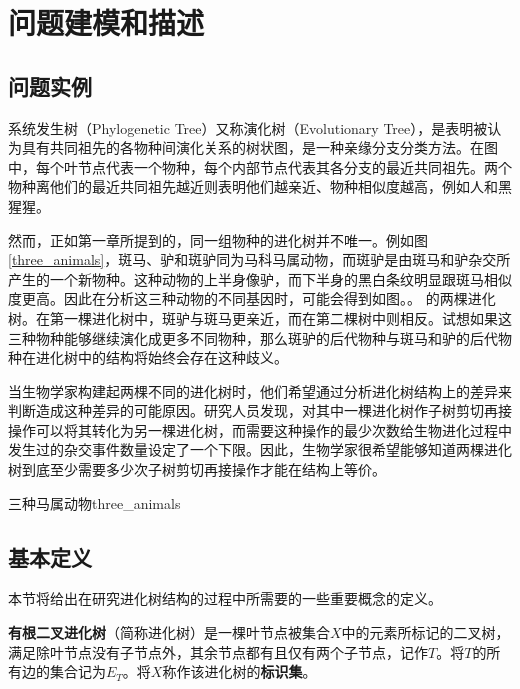 
\chapter{问题建模和描述}

\section{问题实例}

系统发生树（Phylogenetic Tree）又称演化树（Evolutionary Tree），是表明被认为具有共同祖先的各物种间演化关系的树状图，是一种亲缘分支分类方法。在图中，每个叶节点代表一个物种，每个内部节点代表其各分支的最近共同祖先。两个物种离他们的最近共同祖先越近则表明他们越亲近、物种相似度越高，例如人和黑猩猩。
$ $\\

然而，正如第一章所提到的，同一组物种的进化树并不唯一。例如图\ref{three_animals}，斑马、驴和斑驴同为马科马属动物，而斑驴是由斑马和驴杂交所产生的一个新物种。这种动物的上半身像驴，而下半身的黑白条纹明显跟斑马相似度更高。因此在分析这三种动物的不同基因时，可能会得到如图。。 的两棵进化树。在第一棵进化树中，斑驴与斑马更亲近，而在第二棵树中则相反。试想如果这三种物种能够继续演化成更多不同物种，那么斑驴的后代物种与斑马和驴的后代物种在进化树中的结构将始终会存在这种歧义。

当生物学家构建起两棵不同的进化树时，他们希望通过分析进化树结构上的差异来判断造成这种差异的可能原因。研究人员发现，对其中一棵进化树作子树剪切再接操作可以将其转化为另一棵进化树，而需要这种操作的最少次数给生物进化过程中发生过的杂交事件数量设定了一个下限。因此，生物学家很希望能够知道两棵进化树到底至少需要多少次子树剪切再接操作才能在结构上等价。

\begin{pics}[htbp]{三种马属动物}{three_animals} 
\end{pics}


\section{基本定义}
本节将给出在研究进化树结构的过程中所需要的一些重要概念的定义。

\begin{dingyi}
\textbf{有根二叉进化树}（简称进化树）是一棵叶节点被集合$X$中的元素所标记的二叉树，满足除叶节点没有子节点外，其余节点都有且仅有两个子节点，记作$T$。将$T$的所有边的集合记为$E_T$。将\textbf{$X$}称作该进化树的\textbf{标识集}。
\end{dingyi}

